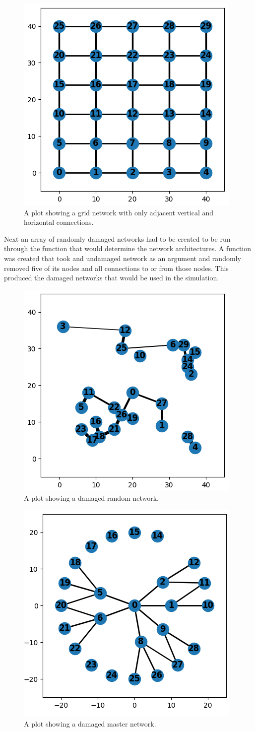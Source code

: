 \documentclass[10pt]{article}
\begin{document}
\begin{figure}
\begin{center}
\includegraphics[width=0.33\columnwidth]{figures/GridLayout.png}
\end{center}
\caption{A plot showing a grid network with only adjacent vertical and horizontal connections.}
\end{figure}

Next an array of randomly damaged networks had to be created to be run through the function that would determine the network architectures. A function was created that took and undamaged network as an argument and randomly removed five of its nodes and all connections to or from those nodes. This produced the damaged networks that would be used in the simulation.\par

\begin{figure}
\begin{center}
\includegraphics[width=0.33\columnwidth]{figures/DamagedRandomLayout.png}
\end{center}
\caption{A plot showing a damaged random network.}
\end{figure}

\begin{figure}
\begin{center}
\includegraphics[width=0.33\columnwidth]{figures/DamagedMasterLayout.png}
\end{center}
\caption{A plot showing a damaged master network.}
\end{figure}
\end{document}
